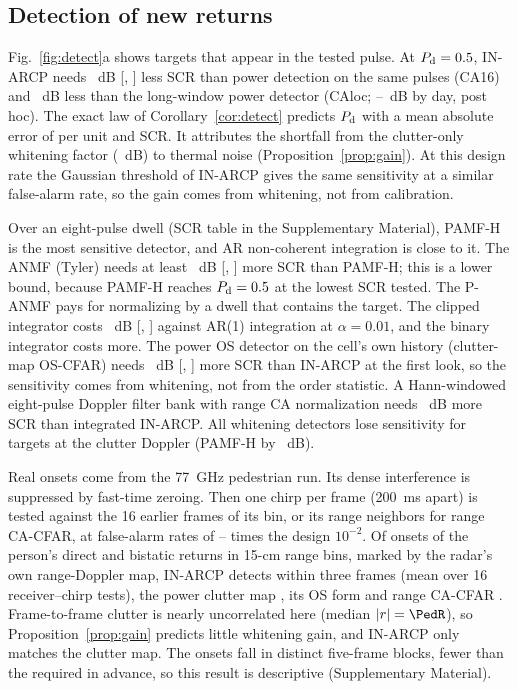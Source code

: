 \documentclass[journal]{IEEEtran}
\begin{document}
\subsection{Detection of new returns}\label{sec:detect}
Fig.~\ref{fig:detect}a shows targets that appear in the tested pulse. At $P_{\rm d}=0.5$, IN-ARCP needs \DetINGainCAHalf~dB [\DetINGainCALoHalf, \DetINGainCAHiHalf] less SCR than power detection on the same pulses (CA16) and \DetINGainLocHalf~dB less than the long-window power detector (CAloc; \DayGainMin--\DayGainMax~dB by day, post hoc). The exact law of Corollary~\ref{cor:detect} predicts $P_{\rm d}$ with a mean absolute error of \DetMae{} per unit and SCR. It attributes the shortfall from the clutter-only whitening factor (\DetNaiveGain~dB) to thermal noise (Proposition~\ref{prop:gain}). At this design rate the Gaussian threshold of IN-ARCP gives the same sensitivity at a similar false-alarm rate, so the gain comes from whitening, not from calibration.

Over an eight-pulse dwell (SCR table in the Supplementary Material), PAMF-H is the most sensitive detector, and AR non-coherent integration is close to it. The ANMF (Tyler) needs at least \AFpMinusPamf~dB [\AFpMinusPamfLo, \AFpMinusPamfHi] more SCR than PAMF-H; this is a lower bound, because PAMF-H reaches $P_{\rm d}=0.5$ at the lowest SCR tested. The P-ANMF pays for normalizing by a dwell that contains the target. The clipped integrator costs \AClipMinusDin~dB [\AClipMinusDinLo, \AClipMinusDinHi] against AR(1) integration at $\alpha=0.01$, and the binary integrator costs more. The power OS detector on the cell's own history (clutter-map OS-CFAR) needs \AOsrawMinusIn~dB [\AOsrawMinusInLo, \AOsrawMinusInHi] more SCR than IN-ARCP at the first look, so the sensitivity comes from whitening, not from the order statistic. A Hann-windowed eight-pulse Doppler filter bank with range CA normalization needs \ClINvsMTD~dB more SCR than integrated IN-ARCP. All whitening detectors lose sensitivity for targets at the clutter Doppler (PAMF-H by \ClPAMFMatched~dB).

Real onsets come from the 77~GHz pedestrian run. Its dense interference is suppressed by fast-time zeroing. Then one chirp per frame (200~ms apart) is tested against the 16 earlier frames of its bin, or its range neighbors for range CA-CFAR, at false-alarm rates of \PedPfaMin--\PedPfaMax{} times the design $10^{-2}$. Of \PedEvents{} onsets of the person's direct and bistatic returns in 15-cm range bins, marked by the radar's own range-Doppler map, IN-ARCP detects \PedIN{} within three frames (mean over 16 receiver--chirp tests), the power clutter map \PedCA, its OS form \PedOS{} and range CA-CFAR \PedRCA. Frame-to-frame clutter is nearly uncorrelated here (median $|r|=\PedR$), so Proposition~\ref{prop:gain} predicts little whitening gain, and IN-ARCP only matches the clutter map. The onsets fall in \PedBlocks{} distinct five-frame blocks, fewer than the \PedBlocksReq{} required in advance, so this result is descriptive (Supplementary Material).
\end{document}
